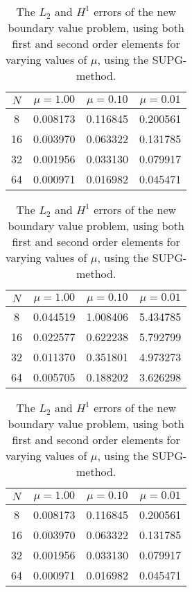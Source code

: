 \documentclass[]{article}
\begin{document}
\begin{table}[htpb]
    \centering
    \caption{The $L_2$ and $H^1$ errors of the new boundary value problem,
    using both first and second order elements for varying values of $\mu$, using the SUPG-method.}
    \label{tbl:errors_supg}
    
    \begin{tabular}{cccc}
        \toprule
        {$N$} &         $\mu = 1.00$ &         $\mu = 0.10$ &       $\mu=0.01$ \\
        \midrule
        8  &  0.008173 &  0.116845 &  0.200561 \\
        16 &  0.003970 &  0.063322 &  0.131785 \\
        32 &  0.001956 &  0.033130 &  0.079917 \\
        64 &  0.000971 &  0.016982 &  0.045471 \\
        \bottomrule
    \end{tabular}\vspace{2em}

    \begin{tabular}{cccc}
        \toprule
        {$N$} &         $\mu = 1.00$ &         $\mu = 0.10$ &       $\mu=0.01$ \\
        \midrule
        8  &  0.044519 &  1.008406 &  5.434785 \\
        16 &  0.022577 &  0.622238 &  5.792799 \\
        32 &  0.011370 &  0.351801 &  4.973273 \\
        64 &  0.005705 &  0.188202 &  3.626298 \\
        \bottomrule
    \end{tabular}\vspace{2em}

    \begin{tabular}{cccc}
        \toprule
        {$N$} &         $\mu = 1.00$ &         $\mu = 0.10$ &       $\mu=0.01$ \\
        \midrule
        8  &  0.008173 &  0.116845 &  0.200561 \\
        16 &  0.003970 &  0.063322 &  0.131785 \\
        32 &  0.001956 &  0.033130 &  0.079917 \\
        64 &  0.000971 &  0.016982 &  0.045471 \\
        \bottomrule
    \end{tabular}\vspace{2em}


\end{table}
\end{document}
